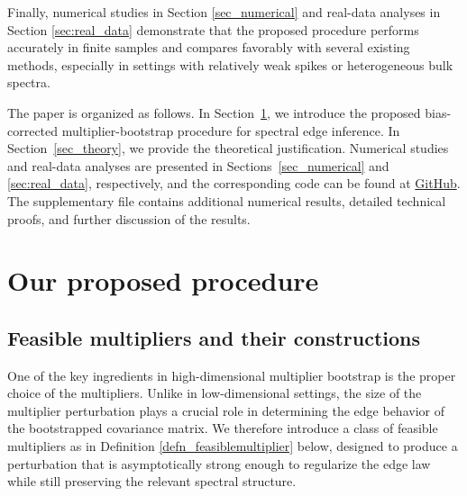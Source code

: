 \documentclass[12pt]{article}
\theoremstyle{plain}
\numberwithin{equation}{section}
\begin{document}
Finally, numerical studies in Section \ref{sec_numerical} and real-data analyses in Section \ref{sec:real_data} demonstrate that the proposed procedure performs accurately in finite samples and compares favorably with several existing methods, especially in settings with relatively weak spikes or heterogeneous bulk spectra.

The paper is organized as follows. In Section~\ref{sec_proposedapproach}, we introduce the proposed bias-corrected multiplier-bootstrap procedure for spectral edge inference. In Section~\ref{sec_theory}, we provide the theoretical justification. Numerical studies and real-data analyses are presented in Sections~\ref{sec_numerical} and \ref{sec:real_data}, respectively, and the corresponding code can be found at \href{https://github.com/EthanHuStat/MultiplierBootstrap}{GitHub}. The supplementary file contains additional numerical results, detailed technical proofs, and further discussion of the results.






\section{Our proposed procedure}\label{sec_proposedapproach}

\subsection{Feasible multipliers and their constructions}
One of the key ingredients in high-dimensional multiplier bootstrap is the proper choice of the multipliers. Unlike in low-dimensional settings, the size of the multiplier perturbation plays a crucial role in determining the edge behavior of the bootstrapped covariance matrix. We therefore introduce a class of feasible multipliers as in Definition \ref{defn_feasiblemultiplier} below, designed to produce a perturbation that is asymptotically strong enough to regularize the edge law while still preserving the relevant spectral structure.
\end{document}

